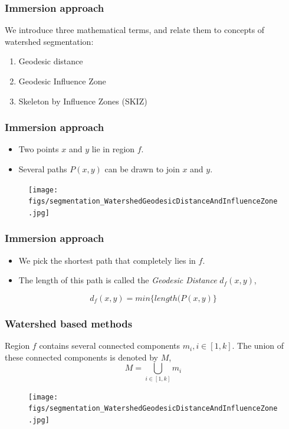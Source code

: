 \begin{frame}
\frametitle{Immersion approach}
\logoCSIPCPL\mypagenum
	We introduce three mathematical terms, and relate them to concepts of watershed segmentation:
	\begin{enumerate}
		\item Geodesic distance
		\item Geodesic Influence Zone
		\item Skeleton by Influence Zones (SKIZ)
	\end{enumerate}
\end{frame}





\begin{frame}
\frametitle{Immersion approach}
\logoCSIPCPL\mypagenum
	\begin{itemize}
		\item Two points $x$ and $y$ lie in region $f$.
		\item Several paths $P(x,y)$ can be drawn to join $x$ and $y$.
	\end{itemize}
	\begin{figure}[!htp]
		\texttt{[image: figs/segmentation\_WatershedGeodesicDistanceAndInfluenceZone.jpg]}
	\end{figure}
\end{frame}





\begin{frame}
\frametitle{Immersion approach}
\logoCSIPCPL\mypagenum
	\begin{itemize}
		\item We pick the shortest path that completely lies in $f$.
		\item The length of this path is called the \emph{Geodesic Distance} $d_f(x,y)$,
	\end{itemize}
	\begin{equation}
		d_f(x,y)= min \{ length(P(x,y) \}
	\end{equation}
\end{frame}



\begin{frame}
\frametitle{Watershed based methods}
\logoCSIPCPL\mypagenum
	Region $f$ contains several connected components $m_i, i \in [1,k]$.  The union of these connected components is denoted by $M$,
	\begin{equation}
		M=\bigcup_{i \in [1,k]} m_i
	\end{equation}
	\begin{figure}[!htp]
		\texttt{[image: figs/segmentation\_WatershedGeodesicDistanceAndInfluenceZone.jpg]}
	\end{figure}
\end{frame}





